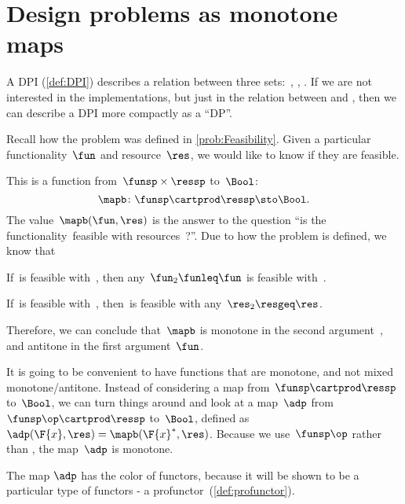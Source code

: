 

\section[DPs as monotone maps]{Design problems as monotone maps}
\label{sec:dpdefinition}



A DPI (\cref{def:DPI}) describes a relation between three sets:~\funsp, \ressp, \impsp.
If we are not interested in the implementations, but just in the relation between \funsp and \ressp, then we can describe a DPI more compactly as a ``DP''\@.

Recall how the problem \Feasibility was defined in \cref{prob:Feasibility}.
Given a particular functionality~$\fun$ and resource~$\res$, we would like to know if they are feasible.

This is a function from~$\funsp \times \ressp$ to~$\Bool$:
%
\begin{equation}
    \mapb\colon \funsp \cartprod \ressp \sto \Bool.
\end{equation}
%
The value~$\mapb(\fun, \res)$ is the answer to the question ``is the functionality~\fun feasible with resources~\res?''.
Due to how the problem is defined, we know that%
\begin{compactenum}
    \item If~\fun is feasible with~\res, then any~$\fun_2 \funleq \fun$ is feasible with~\res.
    \item If~\fun is feasible with~\res, then~\fun is feasible with any~$\res_2 \resgeq \res$.
\end{compactenum}
Therefore, we can conclude that~$\mapb$ is monotone in the second argument~\res, and antitone in the first argument~$\fun$.

It is going to be convenient to have functions that are monotone, and not mixed
monotone/antitone.
Instead of considering a map from~$\funsp \cartprod \ressp$ to~$\Bool$, we can turn things around and look at a map~$\adp$ from~$\funsp\op \cartprod \ressp$ to~$\Bool$, defined as~$\adp(\F{x},\res) = \mapb(\F{x}^*,\res)$.
Because we use~$\funsp\op$ rather than \funsp, the map~$\adp$ is monotone.

\begin{remark}[Spoilers]
    The map $\adp$ has the color of functors, because it will be shown to be a particular type of functors - a profunctor~(\cref{def:profunctor}).
\end{remark}


